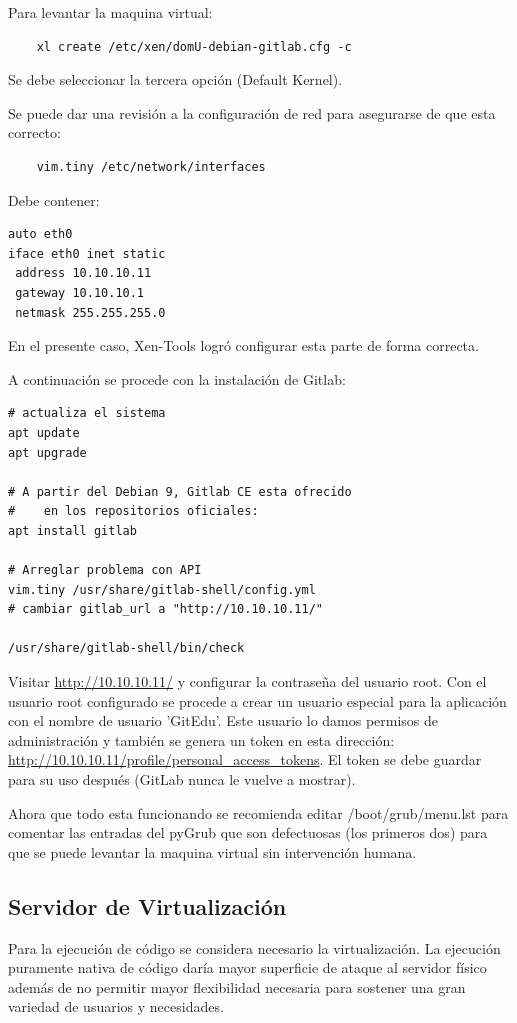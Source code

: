 Para levantar la maquina virtual:

\begin{lstlisting}
	xl create /etc/xen/domU-debian-gitlab.cfg -c
\end{lstlisting}

Se debe seleccionar la tercera opción (Default Kernel).

Se puede dar una revisión a la configuración de red para asegurarse de que esta correcto:

\begin{lstlisting}
	vim.tiny /etc/network/interfaces
\end{lstlisting}

Debe contener:

\begin{lstlisting}
auto eth0
iface eth0 inet static
 address 10.10.10.11
 gateway 10.10.10.1
 netmask 255.255.255.0
\end{lstlisting}

En el presente caso, Xen-Tools logró configurar esta parte de forma correcta.

A continuación se procede con la instalación de Gitlab:

\begin{lstlisting}
# actualiza el sistema
apt update
apt upgrade

# A partir del Debian 9, Gitlab CE esta ofrecido
#    en los repositorios oficiales:
apt install gitlab

# Arreglar problema con API
vim.tiny /usr/share/gitlab-shell/config.yml
# cambiar gitlab_url a "http://10.10.10.11/"

/usr/share/gitlab-shell/bin/check
\end{lstlisting}

Visitar \url{http://10.10.10.11/} y configurar la contraseña del usuario root. Con el usuario root configurado se procede a crear un usuario especial para la aplicación con el nombre de usuario 'GitEdu'. Este usuario lo damos permisos de administración y también se genera un token en esta dirección: \url{http://10.10.10.11/profile/personal_access_tokens}. El token se debe guardar para su uso después (GitLab nunca le vuelve a mostrar).

Ahora que todo esta funcionando se recomienda editar /boot/grub/menu.lst para comentar las entradas del pyGrub que son defectuosas (los primeros dos) para que se puede levantar la maquina virtual sin intervención humana.

\subsection{Servidor de Virtualización}
Para la ejecución de código se considera necesario la virtualización. La ejecución puramente nativa de código daría mayor superficie de ataque al servidor físico además de no permitir mayor flexibilidad necesaria para sostener una gran variedad de usuarios y necesidades.

